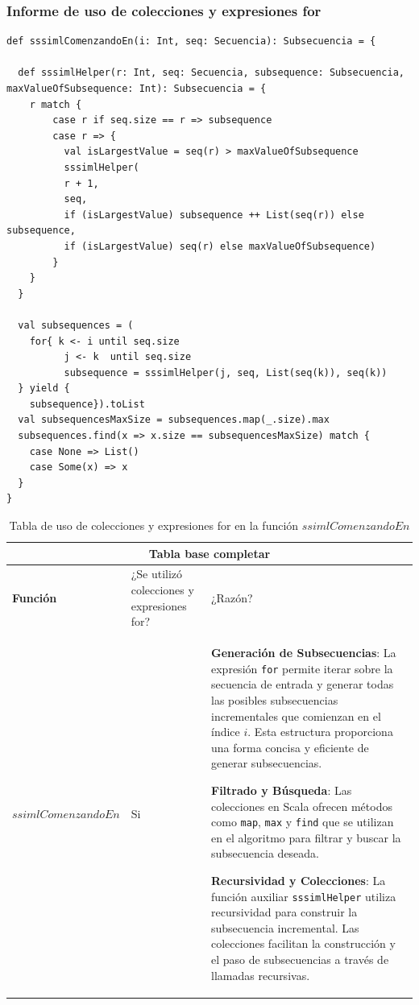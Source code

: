 \documentclass[12pt, a4paper]{article}
\begin{document}
\subsubsection{Informe de uso de colecciones y expresiones for}
\begin{lstlisting}[caption=Código en Scala para la funcion sssimlComenzandoEn, label=lst:scala_code]
def sssimlComenzandoEn(i: Int, seq: Secuencia): Subsecuencia = {
      
  def sssimlHelper(r: Int, seq: Secuencia, subsequence: Subsecuencia, maxValueOfSubsequence: Int): Subsecuencia = {
    r match {
        case r if seq.size == r => subsequence
        case r => {
          val isLargestValue = seq(r) > maxValueOfSubsequence
          sssimlHelper(
          r + 1, 
          seq, 
          if (isLargestValue) subsequence ++ List(seq(r)) else subsequence, 
          if (isLargestValue) seq(r) else maxValueOfSubsequence)
        }
    }
  }

  val subsequences = (
    for{ k <- i until seq.size 
          j <- k  until seq.size
          subsequence = sssimlHelper(j, seq, List(seq(k)), seq(k))
  } yield {
    subsequence}).toList
  val subsequencesMaxSize = subsequences.map(_.size).max
  subsequences.find(x => x.size == subsequencesMaxSize) match {
    case None => List() 
    case Some(x) => x
  }
}
                        \end{lstlisting}
\begin{table}[H]
    \scriptsize
   \begin{tabular}{ |p{4cm}|p{3cm}|p{5.5cm}|  }
    \hline
    \multicolumn{3}{|c|}{Tabla base completar} \\
    \hline
    \textbf{Función}& ¿Se utilizó colecciones y expresiones for?  & ¿Razón?\\
    \hline
    $ssimlComenzandoEn$ & Si &  
    
       \textbf{Generación de Subsecuencias}: La expresión \texttt{for} permite iterar sobre la secuencia de entrada y generar todas las posibles subsecuencias incrementales que comienzan en el índice \(i\). Esta estructura proporciona una forma concisa y eficiente de generar subsecuencias.
      
      \textbf{Filtrado y Búsqueda}: Las colecciones en Scala ofrecen métodos como \texttt{map}, \texttt{max} y \texttt{find} que se utilizan en el algoritmo para filtrar y buscar la subsecuencia deseada.
      
       \textbf{Recursividad y Colecciones}: La función auxiliar \texttt{sssimlHelper} utiliza recursividad para construir la subsecuencia incremental. Las colecciones facilitan la construcción y el paso de subsecuencias a través de llamadas recursivas.
   \\
     \hline
   \end{tabular}
   \centering
   \caption{Tabla de uso de colecciones y expresiones for en la función $ssimlComenzandoEn$}
   \end{table}
\end{document}
